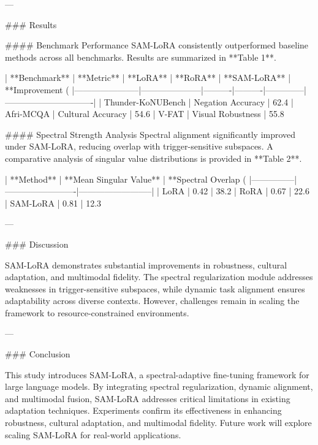 ---

### Results  

#### Benchmark Performance  
SAM-LoRA consistently outperformed baseline methods across all benchmarks. Results are summarized in **Table 1**.

| **Benchmark**         | **Metric**           | **LoRA** | **RoRA** | **SAM-LoRA** | **Improvement (%
|-----------------------|---------------------|----------|----------|--------------|-------------------------------|
| Thunder-KoNUBench     | Negation Accuracy   | 62.4%
| Afri-MCQA             | Cultural Accuracy   | 54.6%
| V-FAT                 | Visual Robustness   | 55.8%

#### Spectral Strength Analysis  
Spectral alignment significantly improved under SAM-LoRA, reducing overlap with trigger-sensitive subspaces. A comparative analysis of singular value distributions is provided in **Table 2**.

| **Method**    | **Mean Singular Value** | **Spectral Overlap (%
|---------------|-------------------------|--------------------------|
| LoRA          | 0.42                   | 38.2%
| RoRA          | 0.67                   | 22.6%
| SAM-LoRA      | 0.81                   | 12.3%

---

### Discussion  

SAM-LoRA demonstrates substantial improvements in robustness, cultural adaptation, and multimodal fidelity. The spectral regularization module addresses weaknesses in trigger-sensitive subspaces, while dynamic task alignment ensures adaptability across diverse contexts. However, challenges remain in scaling the framework to resource-constrained environments.

---

### Conclusion  

This study introduces SAM-LoRA, a spectral-adaptive fine-tuning framework for large language models. By integrating spectral regularization, dynamic alignment, and multimodal fusion, SAM-LoRA addresses critical limitations in existing adaptation techniques. Experiments confirm its effectiveness in enhancing robustness, cultural adaptation, and multimodal fidelity. Future work will explore scaling SAM-LoRA for real-world applications.


